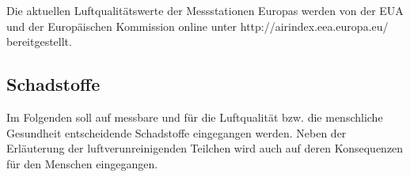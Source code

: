 \begin{table}[H]
	\begin{center}
	\end{center}
	\caption{Wirkung der CO2-Konzentration auf den Menschen \cite{CAQI.Indices}}
\end{table}

Die aktuellen Luftqualitätswerte der Messstationen Europas werden von der EUA und der Europäischen Kommission online unter http://airindex.eea.europa.eu/ bereitgestellt.
\subsection{Schadstoffe}
Im Folgenden soll auf messbare und für die Luftqualität bzw. die menschliche Gesundheit entscheidende Schadstoffe eingegangen werden. Neben der Erläuterung der luftverunreinigenden Teilchen wird auch auf deren Konsequenzen für den Menschen eingegangen. 
